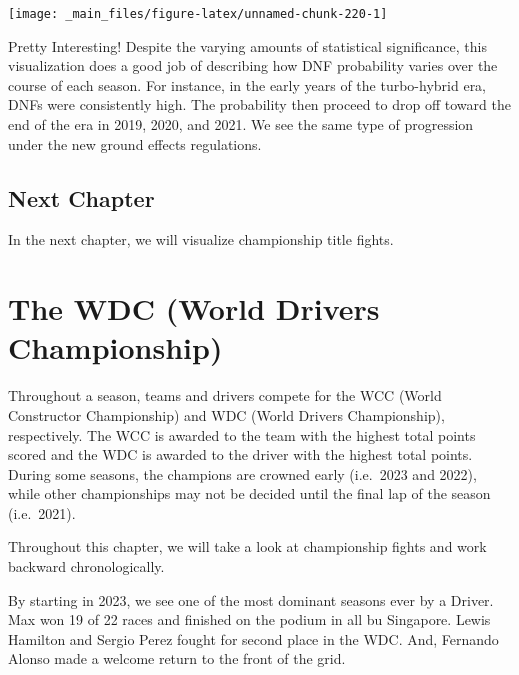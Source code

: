 \documentclass[
]{book}
\begin{document}
\begin{center}\texttt{[image: \_main\_files/figure-latex/unnamed-chunk-220-1]} \end{center}

Pretty Interesting! Despite the varying amounts of statistical significance, this visualization does a good job of describing how DNF probability varies over the course of each season. For instance, in the early years of the turbo-hybrid era, DNFs were consistently high. The probability then proceed to drop off toward the end of the era in 2019, 2020, and 2021. We see the same type of progression under the new ground effects regulations.

\hypertarget{next-chapter-5}{%
\section{Next Chapter}\label{next-chapter-5}}

In the next chapter, we will visualize championship title fights.

\hypertarget{the-wdc-world-drivers-championship}{%
\chapter{The WDC (World Drivers Championship)}\label{the-wdc-world-drivers-championship}}

Throughout a season, teams and drivers compete for the WCC (World Constructor Championship) and WDC (World Drivers Championship), respectively. The WCC is awarded to the team with the highest total points scored and the WDC is awarded to the driver with the highest total points. During some seasons, the champions are crowned early (i.e.~2023 and 2022), while other championships may not be decided until the final lap of the season (i.e.~2021).

Throughout this chapter, we will take a look at championship fights and work backward chronologically.

By starting in 2023, we see one of the most dominant seasons ever by a Driver. Max won 19 of 22 races and finished on the podium in all bu Singapore. Lewis Hamilton and Sergio Perez fought for second place in the WDC. And, Fernando Alonso made a welcome return to the front of the grid.
\end{document}
